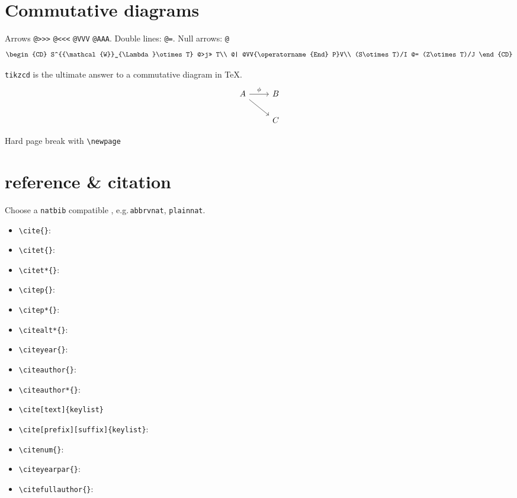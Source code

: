 	
	\section{Commutative diagrams}
	
	Arrows \verb|@>>>| \verb|@<<<| \verb|@VVV| \verb|@AAA|. Double lines: \verb|@=|. Null arrows: \verb|@|
	\begin{equation}\label{key}
		\begin{CD}
			S^{{\mathcal{W}}_{\Lambda}\otimes T} @>j>> T\\
			@|  @VV{\operatorname{End} P}V\\
			(S\otimes T)/I  @= (Z\otimes T)/J
		\end{CD}
	\end{equation}
	
	
	\verb|tikzcd| is the ultimate answer to a commutative diagram in \TeX.
	\[ \begin{tikzcd}
		A \arrow[rd] \arrow[r, "\phi"] & B \\
		& C
	\end{tikzcd}  \]
	
	
	Hard page break with \verb*|\newpage|
	
	\newpage
	
	\section{reference \& citation}
	Choose a \verb*|natbib| compatible \verb||, e.g.\,\verb|abbrvnat|, \verb|plainnat|.
	\begin{itemize}[$\cdot$]
		\item \verb*|\cite{}|: \cite{AkiyamaEtAl2020}
		\item \verb*|\citet{}|: \citet{AkiyamaEtAl2020}
		\item \verb*|\citet*{}|: \citet*{AkiyamaEtAl2020}
		\item \verb*|\citep{}|: \citep{AkiyamaEtAl2020}
		\item \verb*|\citep*{}|: \citep*{AkiyamaEtAl2020}
		\item \verb*|\citealt*{}|: \citealt*{AkiyamaEtAl2020}
		\item \verb*|\citeyear{}|: \citeyear{AkiyamaEtAl2020}
		\item \verb*|\citeauthor{}|: \citeauthor{AkiyamaEtAl2020}
		\item \verb*|\citeauthor*{}|: \citeauthor*{AkiyamaEtAl2020}
		\item \verb*|\cite[text]{keylist}| \cite[Theorem 1]{AkiyamaEtAl2020}
		\item \verb*|\cite[prefix][suffix]{keylist}|: \cite[see e.g.\!][p.\,123]{AkiyamaEtAl2020}
		\item \verb*|\citenum{}|: 
		\item \verb*|\citeyearpar{}|: \citeyearpar{AkiyamaEtAl2020}
		\item \verb*|\citefullauthor{}|: 
	\end{itemize}
	
